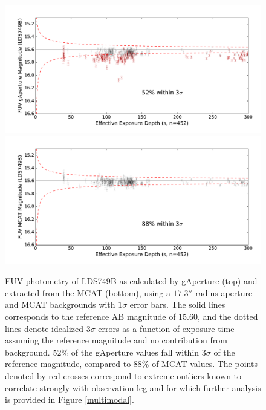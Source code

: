 \documentclass[preprint]{aastex}
\begin{document}
\begin{figure}[t!]
\includegraphics[scale=0.6]{Fig07a.pdf}\\
\includegraphics[scale=0.6]{Fig07b.pdf}
\caption{FUV photometry of LDS749B as calculated by gAperture (top) and extracted from the MCAT (bottom), using a $17.3''$ radius aperture and MCAT backgrounds with $1\sigma$ error bars. The solid lines corresponds to the reference AB magnitude of $15.60$, and the dotted lines denote idealized $3\sigma$ errors as a function of exposure time assuming the reference magnitude and no contribution from background. $52\%$ of the gAperture values fall within $3\sigma$ of the reference magnitude, compared to $88\%$ of MCAT values. The points denoted by red crosses correspond to extreme outliers known to correlate strongly with observation leg and for which further analysis is provided in Figure \ref{multimodal}.
\label{ldsabsphotfuv}}
\end{figure}
\clearpage
\end{document}
